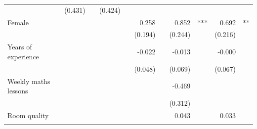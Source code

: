 \documentclass{article}
\begin{document}
\begin{table}[!h]
\begin{tabular}{lllllllllll}
  \multicolumn{1}{l}{} &
  \multicolumn{1}{r}{(0.431)} &
  \multicolumn{1}{l}{} &
  \multicolumn{1}{r}{(0.424)} &
  \multicolumn{1}{l}{} \\
\multicolumn{1}{l}{Female} &
  \multicolumn{1}{r}{} &
  \multicolumn{1}{l}{} &
  \multicolumn{1}{r}{} &
  \multicolumn{1}{l}{} &
  \multicolumn{1}{r}{0.258} &
  \multicolumn{1}{l}{} &
  \multicolumn{1}{r}{0.852} &
  \multicolumn{1}{l}{***} &
  \multicolumn{1}{r}{0.692} &
  \multicolumn{1}{l}{**} \\
\multicolumn{1}{l}{} &
  \multicolumn{1}{r}{} &
  \multicolumn{1}{l}{} &
  \multicolumn{1}{r}{} &
  \multicolumn{1}{l}{} &
  \multicolumn{1}{r}{(0.194)} &
  \multicolumn{1}{l}{} &
  \multicolumn{1}{r}{(0.244)} &
  \multicolumn{1}{l}{} &
  \multicolumn{1}{r}{(0.216)} &
  \multicolumn{1}{l}{} \\
\multicolumn{1}{l}{Years of experience} &
  \multicolumn{1}{r}{} &
  \multicolumn{1}{l}{} &
  \multicolumn{1}{r}{} &
  \multicolumn{1}{l}{} &
  \multicolumn{1}{r}{-0.022} &
  \multicolumn{1}{l}{} &
  \multicolumn{1}{r}{-0.013} &
  \multicolumn{1}{l}{} &
  \multicolumn{1}{r}{-0.000} &
  \multicolumn{1}{l}{} \\
\multicolumn{1}{l}{} &
  \multicolumn{1}{r}{} &
  \multicolumn{1}{l}{} &
  \multicolumn{1}{r}{} &
  \multicolumn{1}{l}{} &
  \multicolumn{1}{r}{(0.048)} &
  \multicolumn{1}{l}{} &
  \multicolumn{1}{r}{(0.069)} &
  \multicolumn{1}{l}{} &
  \multicolumn{1}{r}{(0.067)} &
  \multicolumn{1}{l}{} \\
\multicolumn{1}{l}{Weekly maths lessons} &
  \multicolumn{1}{r}{} &
  \multicolumn{1}{l}{} &
  \multicolumn{1}{r}{} &
  \multicolumn{1}{l}{} &
  \multicolumn{1}{r}{} &
  \multicolumn{1}{l}{} &
  \multicolumn{1}{r}{-0.469} &
  \multicolumn{1}{l}{} &
  \multicolumn{1}{r}{} &
  \multicolumn{1}{l}{} \\
\multicolumn{1}{l}{} &
  \multicolumn{1}{r}{} &
  \multicolumn{1}{l}{} &
  \multicolumn{1}{r}{} &
  \multicolumn{1}{l}{} &
  \multicolumn{1}{r}{} &
  \multicolumn{1}{l}{} &
  \multicolumn{1}{r}{(0.312)} &
  \multicolumn{1}{l}{} &
  \multicolumn{1}{r}{} &
  \multicolumn{1}{l}{} \\
\multicolumn{1}{l}{Room quality} &
  \multicolumn{1}{r}{} &
  \multicolumn{1}{l}{} &
  \multicolumn{1}{r}{} &
  \multicolumn{1}{l}{} &
  \multicolumn{1}{r}{} &
  \multicolumn{1}{l}{} &
  \multicolumn{1}{r}{0.043} &
  \multicolumn{1}{l}{} &
  \multicolumn{1}{r}{0.033} &
  \multicolumn{1}{l}{} \\
\multicolumn{1}{l}{} &
  \multicolumn{1}{r}{} &
  \multicolumn{1}{l}{} &

\end{tabular}
\end{table}
\end{document}
